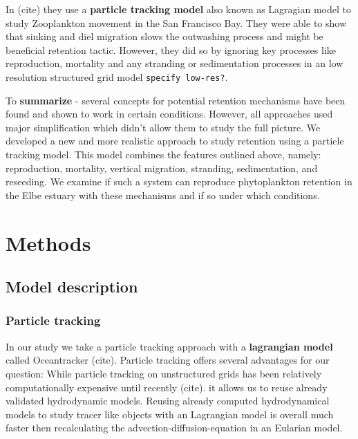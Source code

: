 In (cite) they use a \textbf{particle tracking model} also known as Lagragian model to study Zooplankton movement in the San Francisco Bay.
They were able to show  that sinking and diel migration slows the outwashing process and might be beneficial retention tactic.
However, they did so by ignoring key processes like reproduction, mortality and any stranding or sedimentation processes in an low resolution structured grid model \texttt{specify low-res?}.


To \textbf{summarize} - several concepts for potential retention mechanisms have been found
 and shown to work in certain conditions.
However, all approaches used major simplification which didn't allow them to study the full picture.
We developed a new and more realistic approach to study retention using a particle tracking model.
This model combines the features outlined above, namely: reproduction, mortality, vertical migration, stranding, sedimentation, and reseeding.
We examine if such a system can reproduce phytoplankton retention in the Elbe estuary with these mechanisms and if so under which conditions.




\section*{Methods}

\subsection*{Model description}

\subsubsection*{Particle tracking}

In our study we take a particle tracking approach with a \textbf{lagrangian model} called Oceantracker (cite).
Particle tracking offers several advantages for our question:
While particle tracking on unstructured grids has been relatively computationally expensive until recently (cite).
it allows us to reuse already validated hydrodynamic models.
Reusing already computed hydrodynamical models to study tracer like objects with an Lagrangian model  is overall much faster then recalculating the advection-diffusion-equation in an Eularian model.

